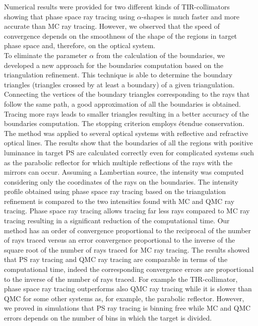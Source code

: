 Numerical results were provided for two different kinds of TIR-collimators showing that phase space ray tracing using $\alpha$-shapes is much faster and more accurate than MC ray tracing. However, we observed that the speed of convergence depends on the smoothness of the shape of the regions in target phase space and, therefore, on the optical system. \\ \indent To eliminate the parameter $\alpha$ from the calculation of the boundaries, we developed a new approach for the boundaries computation based on the triangulation refinement. 
This technique is able to determine the boundary triangles (triangles crossed by at least a boundary) of a given triangulation. Connecting the vertices of the boundary triangles corresponding to the rays that follow the same path, a good approximation of all the boundaries is obtained. Tracing more rays leads to smaller triangles resulting in a better accuracy of the boundaries computation. The stopping criterion employs \'{e}tendue conservation. 
The method was applied to several optical systems with reflective and refractive optical lines. The results show that the boundaries of all the regions with positive luminance in target PS are calculated correctly even for complicated systems such as the parabolic reflector for which multiple reflections of the rays with the mirrors can occur. Assuming a Lambertian source, the intensity was computed considering only the coordinates of the rays on the boundaries. 
The intensity profile obtained using phase space ray tracing based on the triangulation refinement is compared to the two intensities found with MC and QMC ray tracing. Phase space ray tracing allows tracing far less rays compared to MC ray tracing resulting in a significant reduction of the computational time. Our method has an order of convergence proportional to the reciprocal of the number of rays traced versus an error convergence proportional to the inverse of the square root of the number of rays traced for MC ray tracing. The results showed that PS ray tracing and QMC ray tracing are comparable in terms of the computational time, indeed the corresponding convergence errors are proportional to the inverse of the number of rays traced. For example the TIR-collimator, phase space ray tracing outperforms also QMC ray tracing while it is slower than QMC for some other systems as, for example, the parabolic reflector. However, we proved in simulations that PS ray tracing is binning free while MC and QMC errors depends on the number of bins in which the target is divided.
